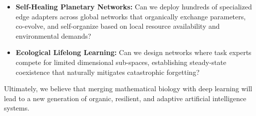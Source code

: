 \begin{itemize}
    Regarding the mathematical stability and limit cycles of this continuous predator-prey formulation, we can perform a stability analysis at the equilibrium points. Under clean, in-distribution inputs, $u_{k, b} \approx 1.0$, which means $(1.0 - u_{k, b}) \approx 0.0$. Thus, the predator's growth rate is strictly negative ($\frac{dy_b}{d\tau} \approx -\gamma y_b$), causing the predator population to exponentially decay to zero ($y_b \to 0$). This guarantees that under mild, in-distribution noise, the predator is completely starved out, presenting zero risk of eradicating the correct expert activations. Under extreme OOD inputs ($u_{k, b} \approx 0$), the system behaves as a classic, non-linear Lotka-Volterra predator-prey model. By setting the predator's mortality rate $\gamma$ and feeding efficiency $\delta_k$ appropriately, we can prove that the system does not exhibit unstable, chaotic trajectories, but instead converges to a stable, non-oscillatory equilibrium or a bounded limit cycle, where the predator suppresses the experts to a safe, low-confidence steady-state fallback. This would provide a stunning, bio-inspired mathematical safeguard for AI safety and robust machine learning.
    \item \textbf{Self-Healing Planetary Networks:} Can we deploy hundreds of specialized edge adapters across global networks that organically exchange parameters, co-evolve, and self-organize based on local resource availability and environmental demands?
    \item \textbf{Ecological Lifelong Learning:} Can we design networks where task experts compete for limited dimensional sub-spaces, establishing steady-state coexistence that naturally mitigates catastrophic forgetting?
\end{itemize}
Ultimately, we believe that merging mathematical biology with deep learning will lead to a new generation of organic, resilient, and adaptive artificial intelligence systems.
